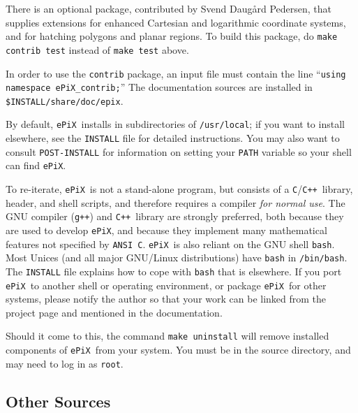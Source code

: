 \documentclass[12pt]{report}
\newcommand{\code}[1]{\texttt{#1}}
\newcommand{\filename}[1]{\texttt{#1}}
\newcommand{\ePiX}{\code{ePiX}}
\newcommand{\C}{\code{C}}
\newcommand{\CXX}{\code{C++}}
\begin{document}
There is an optional package, contributed by Svend Daug{\aa}rd
Pedersen, that supplies extensions for enhanced Cartesian and
logarithmic coordinate systems, and for hatching polygons and planar
regions. To build this package, do \code{make contrib test} instead of
\code{make test} above.

In order to use the \filename{contrib} package, an input file must
contain the line ``\code{using namespace ePiX\_contrib;}'' The
documentation sources are installed in
\filename{\$INSTALL/share/doc/epix}.

By default, \ePiX\ installs in subdirectories of \filename{/usr/local};
if you want to install elsewhere, see the \filename{INSTALL} file for
detailed instructions. You may also want to consult
\filename{POST-INSTALL} for information on setting your \code{PATH}
variable so your shell can find \ePiX.  

To re-iterate, \ePiX\ is not a stand-alone program, but consists of a
\C/\CXX\ library, header, and shell scripts, and therefore requires a
compiler \emph{for normal use}. The GNU compiler (\code{g++}) and
\CXX\ library are strongly preferred, both because they are used to
develop \ePiX, and because they implement many mathematical features
not specified by \code{ANSI~C}.  \ePiX\ is also reliant on the GNU
shell \code{bash}. Most Unices (and all major GNU/Linux distributions)
have \code{bash} in \filename{/bin/bash}. The \code{INSTALL} file
explains how to cope with \code{bash} that is elsewhere. If you port
\ePiX\ to another shell or operating environment, or package \ePiX\ 
for other systems, please notify the author so that your work can be
linked from the project page and mentioned in the documentation.

Should it come to this, the command \code{make uninstall} will remove
installed components of \ePiX\ from your system. You must be in the
source directory, and may need to log in as \code{root}.


\subsection*{Other Sources}
\end{document}

